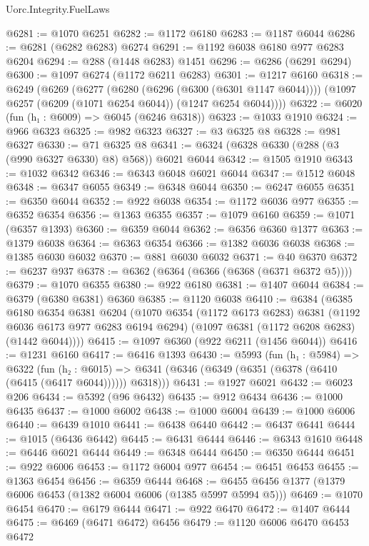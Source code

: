 \begin{lexlean}{Uorc.Integrity.FuelLaws}
\begin{coremodule}
@6281 := @1070 @6251
@6282 := @1172 @6180
@6283 := @1187 @6044
@6286 := @6281 (@6282 @6283) @6274
@6291 := @1192 @6038 @6180 @977 @6283 @6204
@6294 := @288 (@1448 @6283) @1451
@6296 := @6286 (@6291 @6294)
@6300 := @1097 @6274 (@1172 @6211 @6283)
@6301 := @1217 @6160
@6318 := @6249
    (@6269
      (@6277
        (@6280 (@6296 (@6300 (@6301 @1147 @6044))))
        (@1097 @6257 (@6209 (@1071 @6254 @6044)) (@1247 @6254 @6044))))
@6322 := @6020 (fun (h₁ : @6009) => @6045 (@6246 @6318))
@6323 := @1033 @1910
@6324 := @966 @6323
@6325 := @982 @6323
@6327 := @3 @6325 @8
@6328 := @981 @6327
@6330 := @71 @6325 @8
@6341 := @6324 (@6328 @6330 (@288 (@3 (@990 @6327 @6330) @8) @568)) @6021 @6044
@6342 := @1505 @1910
@6343 := @1032 @6342
@6346 := @6343 @6048 @6021 @6044
@6347 := @1512 @6048
@6348 := @6347 @6055
@6349 := @6348 @6044
@6350 := @6247 @6055
@6351 := @6350 @6044
@6352 := @922 @6038
@6354 := @1172 @6036 @977
@6355 := @6352 @6354
@6356 := @1363 @6355
@6357 := @1079 @6160
@6359 := @1071 (@6357 @1393)
@6360 := @6359 @6044
@6362 := @6356 @6360 @1377
@6363 := @1379 @6038
@6364 := @6363 @6354
@6366 := @1382 @6036 @6038
@6368 := @1385 @6030 @6032
@6370 := @881 @6030 @6032
@6371 := @40 @6370
@6372 := @6237 @937
@6378 := @6362 (@6364 (@6366 (@6368 (@6371 @6372 @5))))
@6379 := @1070 @6355
@6380 := @922 @6180
@6381 := @1407 @6044
@6384 := @6379 (@6380 @6381) @6360
@6385 := @1120 @6038
@6410 := @6384
    (@6385
      @6180
      @6354
      @6381
      @6204
      (@1070
        @6354
        (@1172 @6173 @6283)
        @6381
        (@1192 @6036 @6173 @977 @6283 @6194 @6294)
        (@1097 @6381 (@1172 @6208 @6283) (@1442 @6044))))
@6415 := @1097 @6360 (@922 @6211 (@1456 @6044))
@6416 := @1231 @6160
@6417 := @6416 @1393
@6430 := @5993
    (fun (h₁ : @5984) =>
    @6322
      (fun (h₂ : @6015) =>
      @6341 (@6346 (@6349 (@6351 (@6378 (@6410 (@6415 (@6417 @6044)))))) @6318)))
@6431 := @1927 @6021
@6432 := @6023 @206
@6434 := @5392 (@96 @6432)
@6435 := @912 @6434
@6436 := @1000 @6435
@6437 := @1000 @6002
@6438 := @1000 @6004
@6439 := @1000 @6006
@6440 := @6439 @1010
@6441 := @6438 @6440
@6442 := @6437 @6441
@6444 := @1015 (@6436 @6442)
@6445 := @6431 @6444
@6446 := @6343 @1610
@6448 := @6446 @6021 @6444
@6449 := @6348 @6444
@6450 := @6350 @6444
@6451 := @922 @6006
@6453 := @1172 @6004 @977
@6454 := @6451 @6453
@6455 := @1363 @6454
@6456 := @6359 @6444
@6468 := @6455 @6456 @1377 (@1379 @6006 @6453 (@1382 @6004 @6006 (@1385 @5997 @5994 @5)))
@6469 := @1070 @6454
@6470 := @6179 @6444
@6471 := @922 @6470
@6472 := @1407 @6444
@6475 := @6469 (@6471 @6472) @6456
@6479 := @1120 @6006 @6470 @6453 @6472

\end{coremodule}
\end{lexlean}
